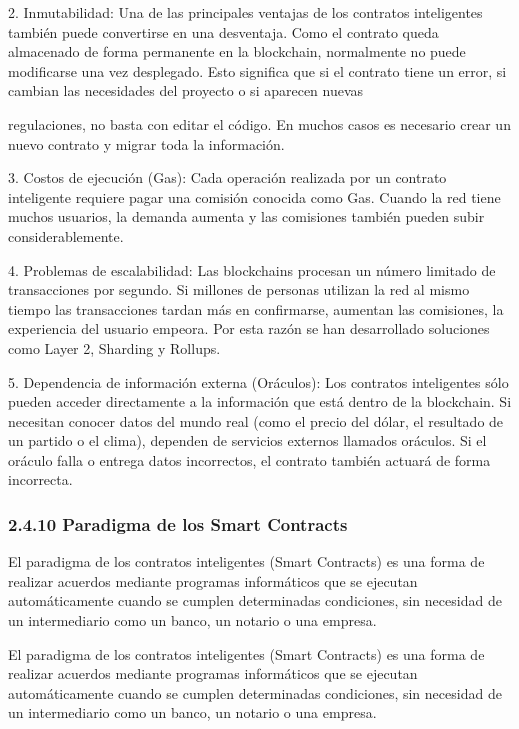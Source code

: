 \documentclass[12pt,a4paper]{article}
\begin{document}
2. Inmutabilidad: Una de las principales ventajas de los contratos inteligentes también puede
convertirse en una desventaja. Como el contrato queda almacenado de forma permanente
en la blockchain, normalmente no puede modificarse una vez desplegado. Esto significa que
si el contrato tiene un error, si cambian las necesidades del proyecto o si aparecen nuevas

regulaciones, no basta con editar el código. En muchos casos es necesario crear un nuevo
contrato y migrar toda la información.

3. Costos de ejecución (Gas): Cada operación realizada por un contrato inteligente requiere
pagar una comisión conocida como Gas. Cuando la red tiene muchos usuarios, la demanda
aumenta y las comisiones también pueden subir considerablemente.

4. Problemas de escalabilidad: Las blockchains procesan un número limitado de
transacciones por segundo. Si millones de personas utilizan la red al mismo tiempo las
transacciones tardan más en confirmarse, aumentan las comisiones, la experiencia del
usuario empeora. Por esta razón se han desarrollado soluciones como Layer 2, Sharding y
Rollups.

5. Dependencia de información externa (Oráculos): Los contratos inteligentes sólo pueden
acceder directamente a la información que está dentro de la blockchain. Si necesitan
conocer datos del mundo real (como el precio del dólar, el resultado de un partido o el
clima), dependen de servicios externos llamados oráculos. Si el oráculo falla o entrega
datos incorrectos, el contrato también actuará de forma incorrecta.

\subsubsection*{2.4.10 Paradigma de los Smart Contracts}

El paradigma de los contratos inteligentes (Smart Contracts) es una forma de realizar
acuerdos mediante programas informáticos que se ejecutan automáticamente cuando se
cumplen determinadas condiciones, sin necesidad de un intermediario como un banco, un
notario o una empresa.

El paradigma de los contratos inteligentes (Smart Contracts) es una forma de realizar
acuerdos mediante programas informáticos que se ejecutan automáticamente cuando se
cumplen determinadas condiciones, sin necesidad de un intermediario como un banco, un
notario o una empresa.
\end{document}
